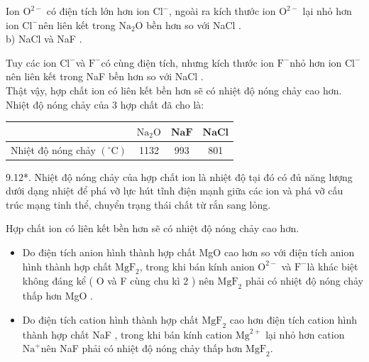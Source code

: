 \documentclass[10pt]{article}
\begin{document}
Ion $\mathrm{O}^{2-}$ có điện tích lớn hơn ion $\mathrm{Cl}^{-}$, ngoài ra kích thước ion $\mathrm{O}^{2-}$ lại nhỏ hơn ion $\mathrm{Cl}^{-}$nên liên kết trong $\mathrm{Na}_{2} \mathrm{O}$ bền hơn so với NaCl .\\
b) NaCl và NaF .

Tuy các ion $\mathrm{Cl}^{-}$và $\mathrm{F}^{-}$có cùng điện tích, nhưng kích thước ion $\mathrm{F}^{-}$nhỏ hơn ion $\mathrm{Cl}^{-}$nên liên kết trong NaF bền hơn so với NaCl .\\
Thật vậy, hợp chất ion có liên kết bền hơn sẽ có nhiệt độ nóng chảy cao hơn.\\
Nhiệt độ nóng chảy của 3 hợp chất đã cho là:

\begin{center}
\begin{tabular}{|c|c|c|c|}
\hline
 & $\mathrm{Na}_{2} \mathrm{O}$ & $\mathbf{N a F}$ & $\mathbf{N a C l}$ \\
\hline
Nhiệt độ nóng chảy $\left({ }^{\circ} \mathrm{C}\right)$ & 1132 & 993 & 801 \\
\hline
\end{tabular}
\end{center}

9.12*. Nhiệt độ nóng chảy của hợp chất ion là nhiệt độ tại đó có đủ năng lượng dưới dạng nhiệt để phá vỡ lực hút tĩnh điện mạnh giữa các ion và phá vỡ cấu trúc mạng tinh thể, chuyển trạng thái chất từ rắn sang lỏng.

Hợp chất ion có liên kết bền hơn sẽ có nhiệt độ nóng chảy cao hơn.

\begin{itemize}
  \item Do điện tích anion hình thành hợp chất MgO cao hơn so với điện tích anion hình thành hợp chất $\mathrm{MgF}_{2}$, trong khi bán kính anion $\mathrm{O}^{2-}$ và $\mathrm{F}^{-}$là khác biệt không đáng kể ( O và F cùng chu kì 2 ) nên $\mathrm{MgF}_{2}$ phải có nhiệt độ nóng chảy thấp hơn MgO .
  \item Do điện tích cation hình thành hợp chất $\mathrm{MgF}_{2}$ cao hơn điện tích cation hình thành hợp chất NaF , trong khi bán kính cation $\mathrm{Mg}^{2+}$ lại nhỏ hơn cation $\mathrm{Na}^{+}$nên NaF phải có nhiệt độ nóng chảy thấp hơn $\mathrm{MgF}_{2}$.
\end{itemize}
\end{document}
